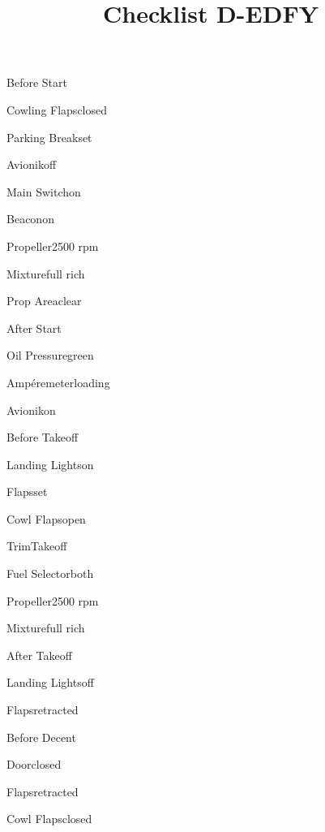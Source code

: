 \def\papersize{6}




\title{Checklist D-EDFY}

\begin{checklist}{Before Start}
  \item{Cowling Flaps}{closed}
  \item{Parking Break}{set}
  \item{Avionik}{off}
  \item{Main Switch}{on}
  \item{Beacon}{on}
  \item{Propeller}{2500 rpm}
  \item{Mixture}{full rich}
  \item{Prop Area}{clear}
\end{checklist}

\begin{checklist}{After Start}
  \item{Oil Pressure}{green}
  \item{Ampéremeter}{loading}
  \item{Avionik}{on}
\end{checklist}

\begin{checklist}{Before Takeoff}
  \item{Landing Lights}{on}
  \item{Flaps}{set}
  \item{Cowl Flaps}{open}
  \item{Trim}{Takeoff}
  \item{Fuel Selector}{both}
  \item{Propeller}{2500 rpm}
  \item{Mixture}{full rich}
\end{checklist}

\begin{checklist}{After Takeoff}
  \item{Landing Lights}{off}
  \item{Flaps}{retracted}
\end{checklist}

\begin{checklist}{Before Decent}
  \item{Door}{closed}
  \item{Flaps}{retracted}
  \item{Cowl Flaps}{closed}
\end{checklist}

